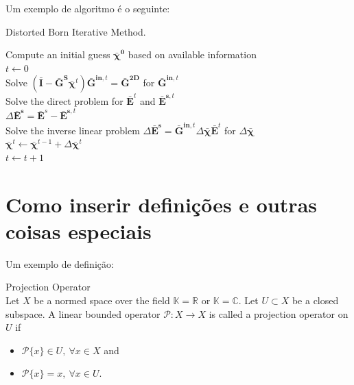 		Um exemplo de algoritmo é o seguinte:
		\begin{algorithm}[!htb]
			\caption{Distorted Born Iterative Method.}
			\label{alg:dbim}
			Compute an initial guess $\boldsymbol{\bar{\chi}^0}$ based on available information \\
			$t\leftarrow0$ \\
			 {
				Solve $\left(\mathbf{\bar{I}} - \mathbf{\bar{G}^S}\boldsymbol{\bar{\chi}}^t\right)\mathbf{\bar{G}}^{\mathbf{in},t} = \mathbf{\bar{G}^{2D}}$ for $\mathbf{\bar{G}}^{\mathbf{in},t}$ \\
				Solve the direct problem for $\mathbf{\bar{E}}^t$ and $\mathbf{\bar{E}}^{\mathbf{s},t}$ \\
				$\Delta\mathbf{\bar{E}^s} = \mathbf{\bar{E}}^s - \mathbf{\bar{E}}^{\mathbf{s},t}$ \\
				Solve the inverse linear problem $\Delta\mathbf{\bar{E}^s} = \mathbf{\bar{G}}^{\mathbf{in},t}\Delta\boldsymbol{\bar{\chi}}\mathbf{\bar{E}}^t$ for $\Delta\boldsymbol{\bar{\chi}}$\\
				$\boldsymbol{\bar{\chi}}^t \leftarrow \boldsymbol{\bar{\chi}}^{t-1} + \Delta\boldsymbol{\bar{\chi}}^t$ \\
				$t\leftarrow t+1$\\
			}
		\end{algorithm}
	
	\chapter{Como inserir definições e outras coisas especiais}

		Um exemplo de definição:
		\begin{definition}\label{def:3:projection}
			Projection Operator\\
			Let $X$ be a normed space over the field $\mathbb{K}=\mathbb{R}$ or $\mathbb{K}=\mathbb{C}$. Let $U\subset X$ be a closed subspace. A linear bounded operator $\mathcal{P} : X\rightarrow X$ is called a projection operator on $U$ if
			\begin{itemize}
				\item $\mathcal{P}\{x\} \in U, ~\forall x\in X$ and
				\item $\mathcal{P}\{x\} = x,~ \forall x\in U$.
			\end{itemize}
		\end{definition}

